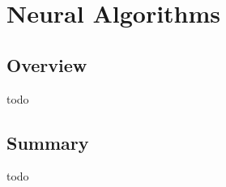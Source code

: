 


\chapter{Neural Algorithms}
\label{ch:neural}

\section{Overview}
todo

\newpage
\newpage
\newpage
\newpage
\newpage
\newpage

\section{Summary}
todo
